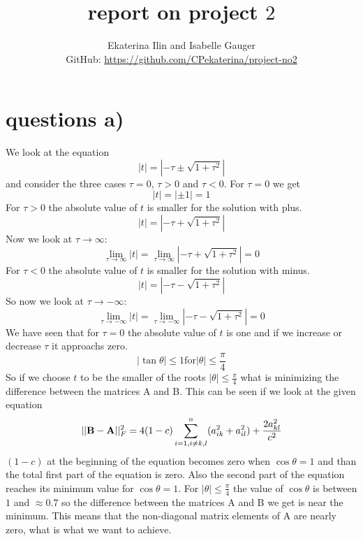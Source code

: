 \documentclass[11pt,a4wide]{article}
\begin{document}
\title{report on project $2$}
\author{Ekaterina Ilin and Isabelle Gauger\\GitHub: \url{https://github.com/CPekaterina/project-no2}
}
\maketitle
\tableofcontents
\newpage
\section{questions a)}
We look at the equation
\begin{equation}
\left|t\right| = \left|-\tau\pm\sqrt{1+\tau^2}\right|
\end{equation}
and consider the three cases $\tau=0$, $\tau>0$ and $\tau<0$.
For $\tau=0$ we get
\begin{equation}
\left|t\right| = \left|\pm1\right| = 1
\end{equation}
For $\tau>0$ the absolute value of $t$ is smaller for the solution with plus.  
\begin{equation}
\left|t\right| = \left|-\tau+\sqrt{1+\tau^2}\right|
\end{equation}
Now we look at $\tau\rightarrow\infty$:   
\begin{equation}  
\lim\limits_{\tau \rightarrow \infty}{\left|t\right|}=\lim\limits_{\tau \rightarrow \infty}{\left|-\tau+\sqrt{1+\tau^2}\right|}=0  
\end{equation}
For $\tau<0$ the absolute value of $t$ is smaller for the solution with minus.
\begin{equation}
\left|t\right| = \left|-\tau-\sqrt{1+\tau^2}\right|
\end{equation}
So now we look at $\tau\rightarrow-\infty$:
\begin{equation}
\lim\limits_{\tau \rightarrow -\infty}{\left|t\right|}=\lim\limits_{\tau \rightarrow -\infty}{\left|-\tau-\sqrt{1+\tau^2}\right|}=0  
\end{equation}
We have seen that for $\tau=0$ the absolute value of $t$ is one and if we increase or decrease $\tau$ it approachs zero.
\begin{equation}
\left|\tan{\theta}\right|\leq1 \text{for} \left|\theta\right|\leq\frac{\pi}{4}
\end{equation}
So if we choose $t$ to be the smaller of the roots $\left|\theta\right|\leq\frac{\pi}{4}$ what is minimizing the difference between the matrices A and B. This can be seen if we look at the given equation
\begin{equation}
||{\bf B}-{\bf A}||_F^2=4(1-c)\sum_{i=1,i\ne k,l}^n(a_{ik}^2+a_{il}^2) +\frac{2a_{kl}^2}{c^2}
\end{equation}
$(1-c)$ at the beginning of the equation becomes zero when $\cos{\theta}=1$ and than the total first part of the equation is zero. Also the second part of the equation reaches its minimum value for $\cos{\theta}=1$. For $\left|\theta\right|\leq\frac{\pi}{4}$ the value of $\cos{\theta}$ is between $1$ and $\approx 0.7$ so the difference between the matrices A and B we get is near the minimum. This means that the non-diagonal matrix elements of A are nearly zero, what is what we want to achieve.  
\end{document}
